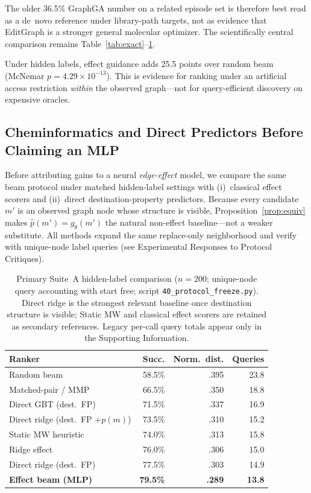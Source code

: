 The older 36.5\% GraphGA number on a related episode set is therefore best read as a de~novo reference under library-path targets, not as evidence that EditGraph is a stronger general molecular optimizer. The scientifically central comparison remains Table~\ref{tab:exact}--\ref{tab:direct}.

Under hidden labels, effect guidance adds 25.5 points over random beam (McNemar $p=4.29\times10^{-13}$). This is evidence for ranking under an artificial access restriction \emph{within} the observed graph---not for query-efficient discovery on expensive oracles.

\subsection{Cheminformatics and Direct Predictors Before Claiming an MLP}
\label{sec:chem_baselines}

Before attributing gains to a neural \emph{edge-effect} model, we compare the same beam protocol under matched hidden-label settings with (i)~classical effect scorers and (ii)~direct destination-property predictors. Because every candidate $m'$ is an observed graph node whose structure is visible, Proposition~\ref{prop:equiv} makes $\widehat{p}(m')=g_\theta(m')$ the natural non-effect baseline---not a weaker substitute. All methods expand the same replace-only neighborhood and verify with unique-node label queries (see Experimental Responses to Protocol Critiques).

\begin{table}[t]
\caption{Primary Suite~A hidden-label comparison ($n{=}200$; unique-node query accounting with start free; script \texttt{40\_protocol\_freeze.py}). Direct ridge is the strongest relevant baseline once destination structure is visible; Static MW and classical effect scorers are retained as secondary references. Legacy per-call query totals appear only in the Supporting Information.}
\label{tab:direct}
\centering
\small
\begin{tabular}{lrrr}
\toprule
Ranker & Succ. & Norm.\ dist. & Queries \\
\midrule
Random beam & 58.5\% & .395 & 23.8 \\
Matched-pair / MMP & 66.5\% & .350 & 18.8 \\
Direct GBT (dest.\ FP) & 71.5\% & .337 & 16.9 \\
Direct ridge (dest.\ FP $+p(m)$) & 73.5\% & .310 & 15.2 \\
Static MW heuristic & 74.0\% & .313 & 15.8 \\
Ridge effect & 76.0\% & .306 & 15.0 \\
Direct ridge (dest.\ FP) & 77.5\% & .303 & 14.9 \\
\textbf{Effect beam (MLP)} & \textbf{79.5\%} & \textbf{.289} & \textbf{13.8} \\
\bottomrule
\end{tabular}
\end{table}

